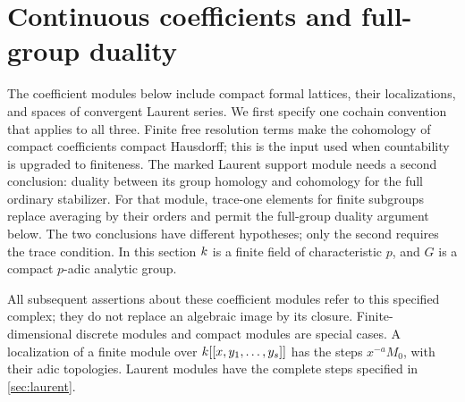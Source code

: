 \section{Continuous coefficients and full-group duality}
\label{sec:continuous}

The coefficient modules below include compact formal lattices, their
localizations, and spaces of convergent Laurent series.  We first specify
one cochain convention that applies to all three. Finite free resolution
terms make the cohomology of compact coefficients compact Hausdorff;
this is the input used when countability is upgraded to finiteness.
The marked Laurent support module needs a second conclusion: duality
between its group homology and cohomology for the full ordinary
stabilizer. For that module, trace-one elements for finite subgroups
replace averaging by their orders and permit the full-group duality
argument below. The two conclusions have different hypotheses; only
the second requires the trace condition. In this section $k$ is a
finite field of characteristic $p$, and $G$ is a compact $p$-adic
analytic group.


All subsequent assertions about these coefficient modules refer to this
specified complex; they do not replace an algebraic image by its closure.
Finite-dimensional discrete modules and compact modules are special
cases.  A localization of a finite module over
$k[[x,y_1,\ldots,y_s]]$ has the steps $x^{-a}M_0$, with their adic
topologies.  Laurent modules have the complete steps specified in
\cref{sec:laurent}.

